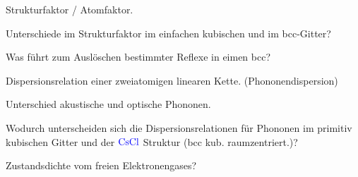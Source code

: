 \documentclass[a5paper,12pt,ngerman,print,grid=front]{kartei}
\let\oldce\ce
\renewcommand*{\ce}[1]{\begingroup\color{blue}\oldce{#1}\endgroup}
\begin{document}
	\begin{karte}{
		Strukturfaktor / Atomfaktor.
		}
          
          
          
    \end{karte}


	\begin{karte}{
		Unterschiede im Strukturfaktor im einfachen kubischen und im bcc-Gitter?
		}
          
          
          
    \end{karte}


	\begin{karte}{
		Was führt zum Auslöschen bestimmter Reflexe in eimen bcc?
		}
          
          
          
    \end{karte}


	\begin{karte}{
		Dispersionsrelation einer zweiatomigen linearen Kette. (Phononendispersion)
		}
          
          
          
    \end{karte}


	\begin{karte}{
		Unterschied akustische und optische Phononen.
		}
          
          
          
    \end{karte}


	\begin{karte}{
		Wodurch unterscheiden sich die Dispersionsrelationen für Phononen im primitiv 
        kubischen Gitter und der $\ce{CsCl}$ Struktur (bcc kub. raumzentriert.)?
		}
          
          
          
    \end{karte}


	\begin{karte}{
		Zustandsdichte vom freien Elektronengases?
		}
          
          
          
    \end{karte}
\end{document}

